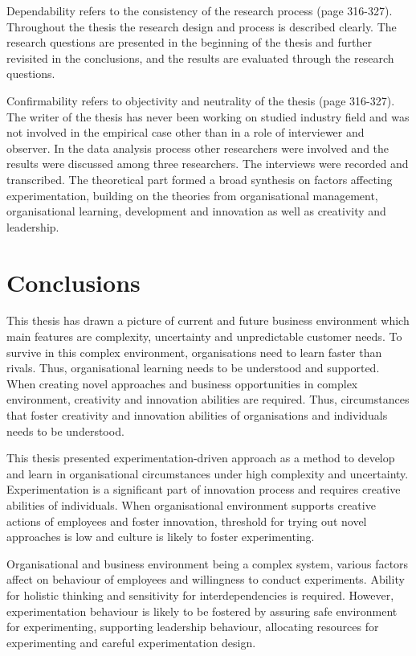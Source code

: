 Dependability refers to the consistency of the research process \citep{lincoln1985naturalistic} (page 316-327). Throughout the thesis the research design and process is described clearly. The research questions are presented in the beginning of the thesis and further revisited in the conclusions, and the results are evaluated through the research questions.

Confirmability refers to objectivity and neutrality of the thesis \citep{lincoln1985naturalistic} (page 316-327). The writer of the thesis has never been working on studied industry field and was not involved in the empirical case other than in a role of interviewer and observer. In the data analysis process other researchers were involved and the results were discussed among three researchers. The interviews were recorded and transcribed. The theoretical part formed a broad synthesis on factors affecting experimentation, building on the theories from organisational management, organisational learning, development and innovation as well as creativity and leadership. 

\chapter{Conclusions}
This thesis has drawn a picture of current and future business environment which main features are complexity, uncertainty and unpredictable customer needs. To survive in this complex environment, organisations need to learn faster than rivals. Thus, organisational learning needs to be understood and supported. When creating novel approaches and business opportunities in complex environment, creativity and innovation abilities are required. Thus, circumstances that foster creativity and innovation abilities of organisations and individuals needs to be understood. 

This thesis presented experimentation-driven approach as a method to develop and learn in organisational circumstances under high complexity and uncertainty. Experimentation is a significant part of innovation process and requires creative abilities of individuals. When organisational environment supports creative actions of employees and foster innovation, threshold for trying out novel approaches is low and culture is likely to foster experimenting. 

Organisational and business environment being a complex system, various factors affect on behaviour of employees and willingness to conduct experiments. Ability for holistic thinking and sensitivity for interdependencies is required. However, experimentation behaviour is likely to be fostered by assuring safe environment for experimenting, supporting leadership behaviour, allocating resources for experimenting and careful experimentation design. 



